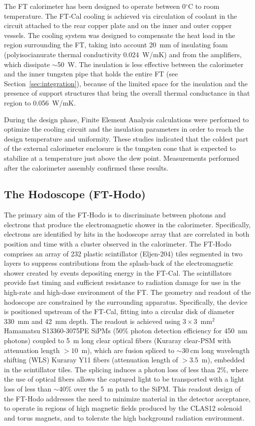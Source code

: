 The FT calorimeter has been designed to operate between 0$^\circ$C to room temperature. The FT-Cal cooling is
achieved via circulation of coolant in the circuit attached to the rear copper plate and on the inner and outer copper
vessels. The cooling system was designed to compensate the heat load in the region surrounding the FT, taking into
account 20~mm of insulating foam (polyisocianurate thermal conductivity 0.024~W/mK) and from the amplifiers, which
dissipate $\sim$50~W. The insulation is less effective between the calorimeter and the inner tungsten pipe that
holds the entire FT (see Section~\ref{sec:integration}), because of the limited space for the insulation and the
presence of support structures that bring the overall thermal conductance in that region to 0.056~W/mK.

During the design phase, Finite Element Analysis calculations were performed to optimize the cooling circuit and the
insulation parameters in order to reach the design temperature and uniformity. These studies indicated that the
coldest part of the external calorimeter enclosure is the tungsten cone that is expected to stabilize at a temperature
just above the dew point. Measurements performed after the calorimeter assembly confirmed these results.

\subsection{The Hodoscope (FT-Hodo)}

The primary aim of the FT-Hodo is to discriminate between photons and electrons that produce the electromagnetic
shower in the calorimeter. Specifically, electrons are identified by hits in the hodoscope array that are correlated
in both position and time with a cluster observed in the calorimeter. The FT-Hodo comprises an array of 232 plastic
scintillator (Eljen-204) tiles segmented in two layers to suppress contributions from the splash-back of the
electromagnetic shower created by events depositing energy in the FT-Cal. The scintillators provide fast timing and
sufficient resistance to radiation damage for use in the high-rate and high-dose environment of the FT. The geometry
and readout of the hodoscope are constrained by the surrounding apparatus. Specifically, the device is positioned
upstream of the FT-Cal, fitting into a circular disk of diameter 330~mm and 42~mm depth. The readout is achieved
using $3 \times 3$~mm$^2$ Hamamatsu S13360-3075PE SiPMs (50\% photon detection efficiency for 450~nm
photons) coupled to 5~m long clear optical fibers (Kuraray clear-PSM with attenuation length $>10$~m), which are
fusion spliced to $\sim 30~$cm long wavelength shifting (WLS) Kuraray Y11 fibers (attenuation length of $> 3.5$~m),
embedded in the scintillator tiles. The splicing induces a photon loss of less than 2\%, where the use of optical fibers
allows the captured light to be transported with a light loss of less than $\sim$40\% over the 5~m path to the SiPM.
This readout design of the FT-Hodo addresses the need to minimize material in the detector acceptance, to operate
in regions of high magnetic fields produced by the CLAS12 solenoid and torus magnets, and to tolerate the high
background radiation environment. 

